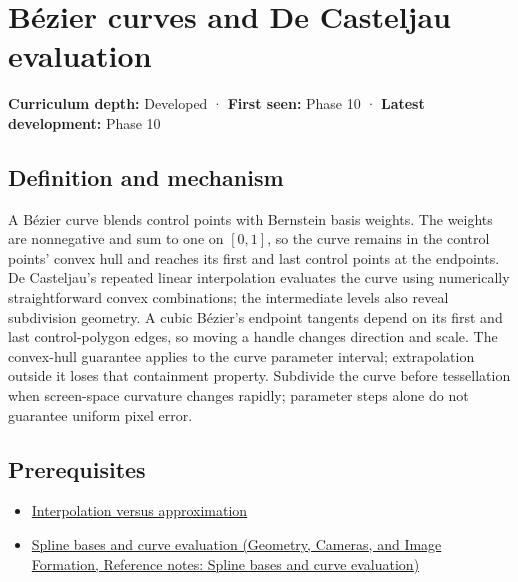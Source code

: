 \hypertarget{appendix-ddbec701898c}{}\label{referencestart:appendix-ddbec701898c}
\section{Bézier curves and De Casteljau evaluation}\label{appendix-ddbec701898c-buxe9zier-curves-and-de-casteljau-evaluation}

\hypertarget{appendix-ddbec701898c-bézier-curves-and-de-casteljau-evaluation}{}

\textbf{Curriculum depth:} Developed · \textbf{First seen:} Phase 10 · \textbf{Latest development:} Phase 10

\begin{allmightroledefinition}

\subsection{Definition and mechanism}\label{appendix-ddbec701898c-definition-and-mechanism}

\hypertarget{appendix-ddbec701898c-definition-and-mechanism}{}

A Bézier curve blends control points with Bernstein basis weights. The weights are nonnegative and sum to one on \([0,1]\), so the curve remains in the control points' convex hull and reaches its first and last control points at the endpoints. De Casteljau's repeated linear interpolation evaluates the curve using numerically straightforward convex combinations; the intermediate levels also reveal subdivision geometry. A cubic Bézier's endpoint tangents depend on its first and last control-polygon edges, so moving a handle changes direction and scale. The convex-hull guarantee applies to the curve parameter interval; extrapolation outside it loses that containment property. Subdivide the curve before tessellation when screen-space curvature changes rapidly; parameter steps alone do not guarantee uniform pixel error.

\end{allmightroledefinition}

\subsection{Prerequisites}\label{appendix-ddbec701898c-prerequisites}

\hypertarget{appendix-ddbec701898c-prerequisites}{}

\begin{itemize}
\tightlist
\item
  \hyperref[appendix-0c2a5f69851e]{Interpolation versus approximation}
\item
  \href{../03-Geometry-Cameras-and-Image-Formation/main.pdf\#nameddest=appendix-f28eeec97a3d}{Spline bases and curve evaluation (Geometry, Cameras, and Image Formation, Reference notes: Spline bases and curve evaluation)}
\end{itemize}

